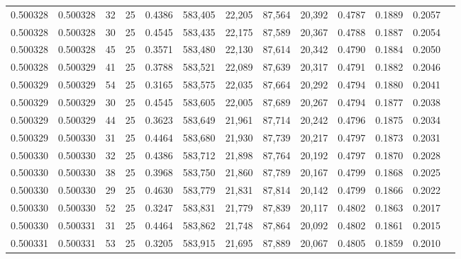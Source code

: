 \begin{tabular}{rrrrrrrrrrrrr}
0.500328 & 0.500328 &    32 &  25 &                                     0.4386 & 583,405 &  22,205 &  87,564 &  20,392 & 0.4787 & 0.1889 & 0.2057 \\
0.500328 & 0.500328 &    30 &  25 &                                     0.4545 & 583,435 &  22,175 &  87,589 &  20,367 & 0.4788 & 0.1887 & 0.2054 \\
0.500328 & 0.500328 &    45 &  25 &                                     0.3571 & 583,480 &  22,130 &  87,614 &  20,342 & 0.4790 & 0.1884 & 0.2050 \\
0.500328 & 0.500329 &    41 &  25 &                                     0.3788 & 583,521 &  22,089 &  87,639 &  20,317 & 0.4791 & 0.1882 & 0.2046 \\
0.500329 & 0.500329 &    54 &  25 &                                     0.3165 & 583,575 &  22,035 &  87,664 &  20,292 & 0.4794 & 0.1880 & 0.2041 \\
0.500329 & 0.500329 &    30 &  25 &                                     0.4545 & 583,605 &  22,005 &  87,689 &  20,267 & 0.4794 & 0.1877 & 0.2038 \\
0.500329 & 0.500329 &    44 &  25 &                                     0.3623 & 583,649 &  21,961 &  87,714 &  20,242 & 0.4796 & 0.1875 & 0.2034 \\
0.500329 & 0.500330 &    31 &  25 &                                     0.4464 & 583,680 &  21,930 &  87,739 &  20,217 & 0.4797 & 0.1873 & 0.2031 \\
0.500330 & 0.500330 &    32 &  25 &                                     0.4386 & 583,712 &  21,898 &  87,764 &  20,192 & 0.4797 & 0.1870 & 0.2028 \\
0.500330 & 0.500330 &    38 &  25 &                                     0.3968 & 583,750 &  21,860 &  87,789 &  20,167 & 0.4799 & 0.1868 & 0.2025 \\
0.500330 & 0.500330 &    29 &  25 &                                     0.4630 & 583,779 &  21,831 &  87,814 &  20,142 & 0.4799 & 0.1866 & 0.2022 \\
0.500330 & 0.500330 &    52 &  25 &                                     0.3247 & 583,831 &  21,779 &  87,839 &  20,117 & 0.4802 & 0.1863 & 0.2017 \\
0.500330 & 0.500331 &    31 &  25 &                                     0.4464 & 583,862 &  21,748 &  87,864 &  20,092 & 0.4802 & 0.1861 & 0.2015 \\
0.500331 & 0.500331 &    53 &  25 &                                     0.3205 & 583,915 &  21,695 &  87,889 &  20,067 & 0.4805 & 0.1859 & 0.2010 \\

\end{tabular}

